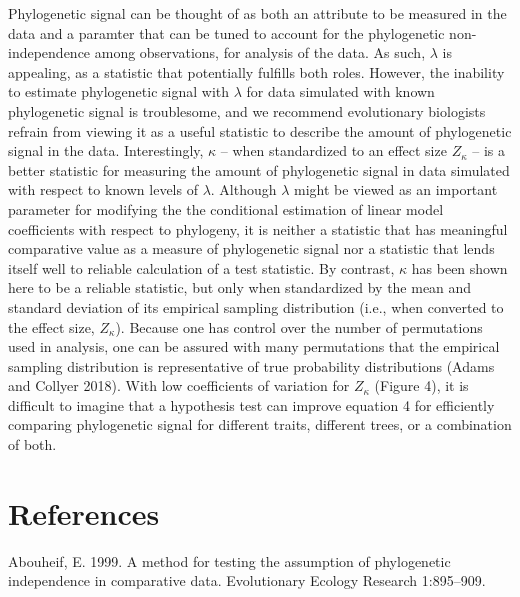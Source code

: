 \documentclass[]{article}
\begin{document}
Phylogenetic signal can be thought of as both an attribute to be
measured in the data and a paramter that can be tuned to account for the
phylogenetic non-independence among observations, for analysis of the
data. As such, \(\lambda\) is appealing, as a statistic that potentially
fulfills both roles. However, the inability to estimate phylogenetic
signal with \(\lambda\) for data simulated with known phylogenetic
signal is troublesome, and we recommend evolutionary biologists refrain
from viewing it as a useful statistic to describe the amount of
phylogenetic signal in the data. Interestingly, \(\kappa\) -- when
standardized to an effect size \(Z_\kappa\) -- is a better statistic for
measuring the amount of phylogenetic signal in data simulated with
respect to known levels of \(\lambda\). Although \(\lambda\) might be
viewed as an important parameter for modifying the the conditional
estimation of linear model coefficients with respect to phylogeny, it is
neither a statistic that has meaningful comparative value as a measure
of phylogenetic signal nor a statistic that lends itself well to
reliable calculation of a test statistic. By contrast, \(\kappa\) has
been shown here to be a reliable statistic, but only when standardized
by the mean and standard deviation of its empirical sampling
distribution (i.e., when converted to the effect size, \(Z_\kappa\)).
Because one has control over the number of permutations used in
analysis, one can be assured with many permutations that the empirical
sampling distribution is representative of true probability
distributions (Adams and Collyer 2018). With low coefficients of
variation for \(Z_\kappa\) (Figure 4), it is difficult to imagine that a
hypothesis test can improve equation 4 for efficiently comparing
phylogenetic signal for different traits, different trees, or a
combination of both.

\newpage

\hypertarget{references}{%
\section{References}\label{references}}

\setlength{\parindent}{-0.25in} \setlength{\leftskip}{0.25in}
\setlength{\parskip}{8pt} \noindent

\hypertarget{refs}{}
\leavevmode\hypertarget{ref-Abouheif1999}{}%
Abouheif, E. 1999. A method for testing the assumption of phylogenetic
independence in comparative data. Evolutionary Ecology Research
1:895--909.
\end{document}
